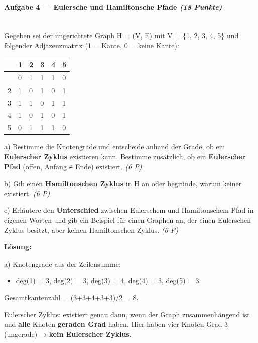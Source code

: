 \documentclass[11pt, a4paper]{article}
\begin{document}
\paragraph{Aufgabe 4 — Eulersche und Hamiltonsche Pfade \textit{(18 Punkte)}}\mbox{}\\[2pt]

Gegeben sei der ungerichtete Graph H = (V, E) mit V = \{1, 2, 3, 4, 5\} und folgender Adjazenzmatrix (1 = Kante, 0 = keine Kante):



{\small
\begin{tabularx}{\linewidth}{XXXXXX}
\hline
\rowcolor{tableheadbg}
{\color{white}\textbf{}} & {\color{white}\textbf{1}} & {\color{white}\textbf{2}} & {\color{white}\textbf{3}} & {\color{white}\textbf{4}} & {\color{white}\textbf{5}} \\[2pt]
\hline
\endhead
\hline
\endfoot
1 & 0 & 1 & 1 & 1 & 0 \\
2 & 1 & 0 & 1 & 0 & 1 \\
3 & 1 & 1 & 0 & 1 & 1 \\
4 & 1 & 0 & 1 & 0 & 1 \\
5 & 0 & 1 & 1 & 1 & 0 \\
\end{tabularx}
}


a) Bestimme die Knotengrade und entscheide anhand der Grade, ob ein \textbf{Eulerscher Zyklus} existieren kann. Bestimme zusätzlich, ob ein \textbf{Eulerscher Pfad} (offen, Anfang ≠ Ende) existiert. \textit{(6 P)}


b) Gib einen \textbf{Hamiltonschen Zyklus} in H an oder begründe, warum keiner existiert. \textit{(6 P)}


c) Erläutere den \textbf{Unterschied} zwischen Eulerschem und Hamiltonschem Pfad in eigenen Worten und gib ein Beispiel für einen Graphen an, der einen Eulerschen Zyklus besitzt, aber keinen Hamiltonschen Zyklus. \textit{(6 P)}


\textbf{Lösung:}


a) Knotengrade aus der Zeilensumme:

\begin{itemize}
  \item deg(1) = 3, deg(2) = 3, deg(3) = 4, deg(4) = 3, deg(5) = 3.
\end{itemize}

Gesamtkantenzahl = (3+3+4+3+3)/2 = 8.


Eulerscher Zyklus: existiert genau dann, wenn der Graph zusammenhängend ist und \textbf{alle} Knoten \textbf{geraden Grad} haben. Hier haben vier Knoten Grad 3 (ungerade) → \textbf{kein Eulerscher Zyklus}.
\end{document}
